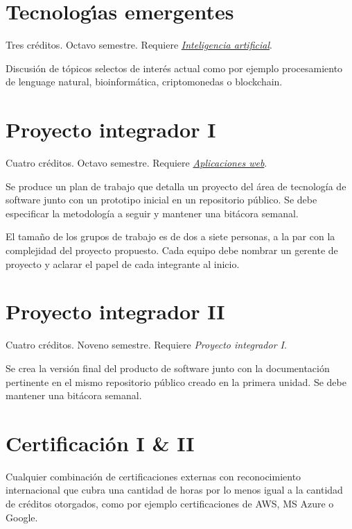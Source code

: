 \documentclass{article}
\begin{document}
\hypertarget{te}{\section*{Tecnolog\'{\i}as emergentes}} 

Tres cr\'{e}ditos. Octavo semestre. Requiere \hyperlink{ia}{\em
  Inteligencia artificial}.

Discusi\'{o}n de t\'{o}picos selectos de inter\'{e}s actual como por ejemplo
procesamiento de lenguage natural, bioinform\'{a}tica, criptomonedas o
blockchain.

\hypertarget{pi1}{\section*{Proyecto integrador I}} 

Cuatro cr\'{e}ditos. Octavo semestre. Requiere \hyperlink{aw}{\em
  Aplicaciones web}.

Se produce un plan de trabajo que detalla un proyecto del \'{a}rea de
tecnolog\'{i}a de software junto con un prototipo inicial en un
repositorio p\'{u}blico. Se debe especificar la metodolog\'{i}a a seguir y
mantener una bit\'{a}cora semanal.

El tama\~{n}o de los grupos de trabajo es de dos a siete personas, a la
par con la complejidad del proyecto propuesto. Cada equipo debe
nombrar un gerente de proyecto y aclarar el papel de cada integrante
al inicio.

\hypertarget{pi2}{\section*{Proyecto integrador II}} 

Cuatro cr\'{e}ditos. Noveno semestre. Requiere {\em Proyecto integrador I}.

Se crea la versi\'{o}n final del producto de software junto con la
documentaci\'{o}n pertinente en el mismo repositorio p\'{u}blico creado en la
primera unidad. Se debe mantener una bit\'{a}cora semanal.

\hypertarget{cert}{\section*{Certificaci\'{o}n I \& II}} 

Cualquier combinaci\'{o}n de certificaciones externas con reconocimiento
internacional que cubra una cantidad de horas por lo menos igual a la
cantidad de cr\'{e}ditos otorgados, como por ejemplo certificaciones de
AWS, MS Azure o Google.
\end{document}
